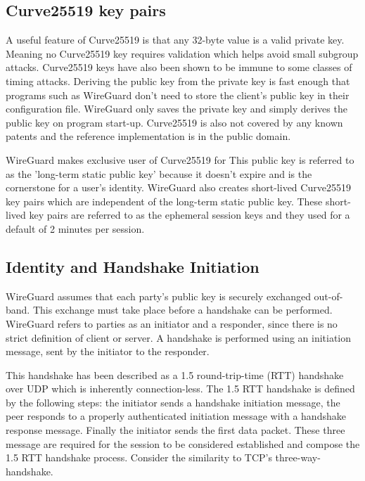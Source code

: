 \documentclass [11pt, proquest] {uwthesis}[2020/02/24]
\begin{document}
\subsection{Curve25519 key pairs} \label{x25519}
A useful feature of Curve25519 is that any 32-byte value is a valid private key. Meaning no Curve25519 key requires validation which helps avoid small subgroup attacks. Curve25519 keys have also been shown to be immune to some classes of timing attacks\cite{noauthor_safecurves_2022}\cite{sasdrich_implementing_2015}.  Deriving the public key from the private key is fast enough that programs such as WireGuard don't need to store the client's public key in their configuration file. WireGuard only saves the private key and simply derives the public key on program start-up. Curve25519 is also not covered by any known patents and the reference implementation is in the public domain.

WireGuard makes exclusive user of Curve25519 for 
This public key is referred to as the 'long-term static public key' because it doesn't expire and is the cornerstone for a user's identity. WireGuard also creates short-lived Curve25519 key pairs which are independent of the long-term static public key. These short-lived key pairs are referred to as the ephemeral session keys and they used for a default of 2 minutes per session.


\subsection {Identity and Handshake Initiation}

WireGuard assumes that each party's public key is securely exchanged out-of-band. This exchange must take place before a handshake can be performed. WireGuard refers to parties as an initiator and a responder, since there is no strict definition of client or server. A handshake is performed using an initiation message, sent by the initiator to the responder. 

This handshake has been described as a 1.5 round-trip-time (RTT) handshake over UDP which is inherently connection-less. The 1.5 RTT handshake is defined by the following steps: the initiator sends a handshake initiation message, the peer responds to a properly authenticated initiation message with a handshake response message. Finally the initiator sends the first data packet. These three message are required for the session to be considered established and compose the 1.5 RTT handshake process. Consider the similarity to TCP's three-way-handshake.
\end{document}
